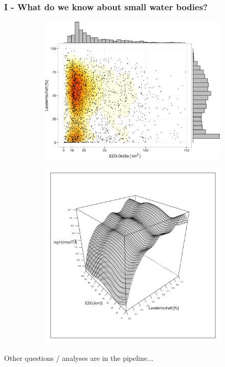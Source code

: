 \documentclass[12pt, t]{beamer}
\begin{document}
\begin{frame}
\frametitle{I - What do we know about small water bodies?}
\begin{figure}
\centering
\begin{subfigure}{.5\textwidth}
  \centering
    \includegraphics[width=\linewidth]{fig/ezg_lu.png}

\end{subfigure}%
\pause
\begin{subfigure}{.5\textwidth}
  \centering
  \includegraphics[width=\linewidth]{fig/lu_ezg_agri_cens.png}
\end{subfigure}
\end{figure}
Other questions / analyses are in the pipeline...
\end{frame}
\end{document}
